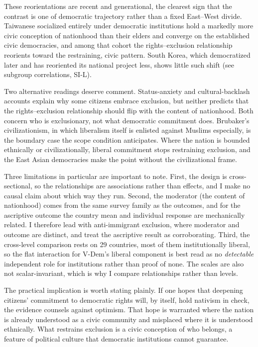 These reorientations are recent and generational, the clearest sign that the contrast is one of democratic trajectory rather than a fixed East--West divide. Taiwanese socialized entirely under democratic institutions hold a markedly more civic conception of nationhood than their elders and converge on the established civic democracies, and among that cohort the rights--exclusion relationship reorients toward the restraining, civic pattern. South Korea, which democratized later and has reoriented its national project less, shows little such shift (see subgroup correlations, SI-L).

Two alternative readings deserve comment. Status-anxiety and cultural-backlash accounts \citep{gidron2017, norris2019} explain why some citizens embrace exclusion, but neither predicts that the rights--exclusion relationship should flip with the content of nationhood. Both concern who is exclusionary, not what democratic commitment does. Brubaker's \citeyearpar{brubaker2017} civilizationism, in which liberalism itself is enlisted against Muslims especially, is the boundary case the scope condition anticipates. Where the nation is bounded ethnically or civilizationally, liberal commitment stops restraining exclusion, and the East Asian democracies make the point without the civilizational frame.

Three limitations in particular are important to note. First, the design is cross-sectional, so the relationships are associations rather than effects, and I make no causal claim about which way they run. Second, the moderator (the content of nationhood) comes from the same survey family as the outcomes, and for the ascriptive outcome the country mean and individual response are mechanically related. I therefore lead with anti-immigrant exclusion, where moderator and outcome are distinct, and treat the ascriptive result as corroborating. Third, the cross-level comparison rests on 29 countries, most of them institutionally liberal, so the flat interaction for V-Dem's liberal component is best read as no \emph{detectable} independent role for institutions rather than proof of none. The scales are also not scalar-invariant, which is why I compare relationships rather than levels.

The practical implication is worth stating plainly. If one hopes that deepening citizens' commitment to democratic rights will, by itself, hold nativism in check, the evidence counsels against optimism. That hope is warranted where the nation is already understood as a civic community and misplaced where it is understood ethnically. What restrains exclusion is a civic conception of who belongs, a feature of political culture that democratic institutions cannot guarantee.

